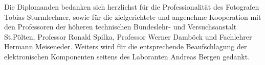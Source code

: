 
\begin{Danksagung}
Die Diplomanden bedanken sich herzlichst für die Professionalität des Fotografen Tobias Sturmlechner, sowie
für die zielgerichtete und angenehme Kooperation mit den Professoren der höheren technischen Bundeslehr- und Versuchsanstalt St.Pölten, 
Professor Ronald Spilka, Professor Werner Damböck und Fachlehrer Hermann Meiseneder. Weiters wird für die entsprechende Beaufschlagung der 
elektronischen Komponenten seitens des Laboranten Andreas Bergen gedankt.
\end{Danksagung}
\newpage

